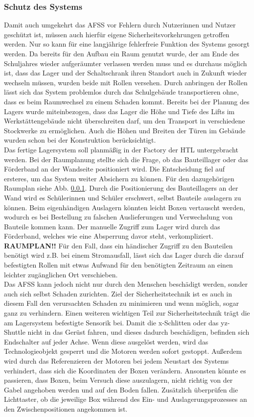 \subsubsection{Schutz des Systems}
Damit auch umgekehrt das AFSS vor Fehlern durch Nutzerinnen und Nutzer geschützt ist, müssen auch hierfür eigene Sicherheitsvorkehrungen getroffen werden. Nur so kann für eine langjährige fehlerfreie Funktion des Systems gesorgt werden.
Da bereits für den Aufbau ein Raum genutzt wurde, der am Ende des Schuljahres wieder aufgeräumter verlassen werden muss und es durchaus möglich ist, dass das Lager und der Schaltschrank ihren Standort auch in Zukunft wieder wechseln müssen, wurden beide mit Rollen versehen. Durch anbringen der Rollen lässt sich das System problemlos durch das Schulgebäude transportieren ohne, dass es beim Raumwechsel zu einem Schaden kommt. Bereits bei der Planung des Lagers wurde miteinbezogen, dass das Lager die Höhe und Tiefe des Lifts im Werkstättengebäude nicht überschreiten darf, um den Transport in verschiedene Stockwerke zu ermöglichen. Auch die Höhen und Breiten der Türen im Gebäude wurden schon bei der Konstruktion berücksichtigt.\\
Das fertige Lagersystem soll planmäßig in der Factory der HTL untergebracht werden. Bei der Raumplanung stellte sich die Frage, ob das Bauteillager oder das Förderband an der Wandseite positioniert wird. Die Entscheidung fiel auf ersteres, um das System weiter Absichern zu können. Für den dazugehörigen Raumplan siehe Abb. \ref{}. Durch die Positionierung des Bauteillagers an der Wand wird es Schülerinnen und Schüler erschwert, selbst Bauteile auslagern zu können. Beim eigenhändigen Auslagern könnten leicht Boxen vertauscht werden, wodurch es bei Bestellung zu falschen Auslieferungen und Verwechslung von Bauteile kommen kann. Der manuelle Zugriff zum Lager wird durch das Förderband, welches wie eine Absperrung davor steht, verkompliziert.
\textbf{RAUMPLAN!!}
Für den Fall, dass ein händischer Zugriff zu den Bauteilen benötigt wird z.B. bei einem Stromausfall, lässt sich das Lager durch die darauf befestigten Rollen mit etwas Aufwand für den benötigten Zeitraum an einen leichter zugänglichen Ort verschieben.\\
Das AFSS kann jedoch nicht nur durch den Menschen beschädigt werden, sonder auch sich selbst Schaden zurichten. Ziel der Sicherheitstechnik ist es auch in diesem Fall den verursachten Schaden zu minimieren und wenn möglich, sogar ganz zu verhindern. Einen weiteren wichtigen Teil zur Sicherheitstechnik trägt die am Lagersystem befestigte Sensorik bei. Damit die x-Schlitten oder das yz-Shuttle nicht in das Gerüst fahren, und dieses dadurch beschädigen, befinden sich Endschalter auf jeder Achse. Wenn diese ausgelöst werden, wird das Technologieobjekt gesperrt und die Motoren werden sofort gestoppt. Außerdem wird durch das Referenzieren der Motoren bei jedem Neustart des Systems verhindert, dass sich die Koordinaten der Boxen verändern. Ansonsten könnte es passieren, dass Boxen, beim Versuch diese auszulagern, nicht richtig von der Gabel angehoben werden und auf den Boden fallen. Zusätzlich überprüfen die Lichttaster, ob die jeweilige Box während des Ein- und Auslagerungsprozesses an den Zwischenpositionen angekommen ist.\\
